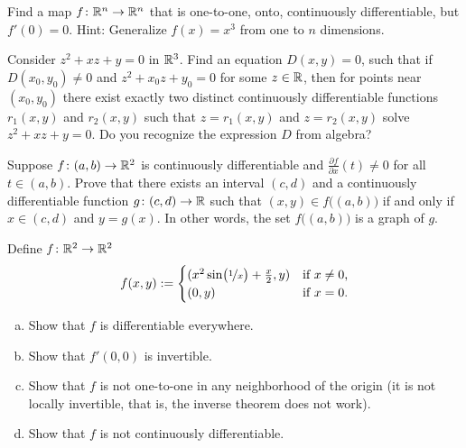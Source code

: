 \begin{exercise}
Find a map $f \colon {\mathbb{R}}^n \to {\mathbb{R}}^n$ that is one-to-one, onto,
continuously differentiable, but $f'(0) = 0$.  Hint: Generalize $f(x) = x^3$ from one
to $n$ dimensions.
\end{exercise}

\begin{exercise}
Consider $z^2 + xz + y =0$ in ${\mathbb{R}}^3$.  Find an equation $D(x,y)=0$, such that
if $D(x_0,y_0) \not= 0$ and $z^2+x_0z+y_0 = 0$ for some $z \in {\mathbb{R}}$,
then for points near $(x_0,y_0)$ there exist
exactly two distinct continuously differentiable functions $r_1(x,y)$
and $r_2(x,y)$ such that $z=r_1(x,y)$ and $z=r_2(x,y)$ solve
$z^2 + xz + y =0$.  Do you recognize the expression $D$ from algebra?
\end{exercise}


\begin{exercise}
Suppose $f \colon (a,b) \to {\mathbb{R}}^2$ is continuously differentiable and
$\frac{\partial f}{\partial x}(t) \not= 0$ for all $t \in (a,b)$.
Prove that there exists an interval $(c,d)$ and
a continuously differentiable function $g \colon (c,d) \to {\mathbb{R}}$
such that 
$(x,y) \in f\bigl((a,b)\bigr)$ if and only if $x \in (c,d)$ and $y=g(x)$.
In other words, the set
$f\bigl((a,b)\bigr)$ is a graph of $g$.
\end{exercise}

\begin{exercise}
Define $f \colon {\mathbb{R}}^2 \to {\mathbb{R}}^2$
\begin{equation*}
f(x,y) :=
\begin{cases}
(x^2 \sin \bigl(\nicefrac{1}{x}\bigr) + \frac{x}{2} , y ) & \text{if $x \not= 0$,} \\
(0,y) & \text{if $x=0$.}
\end{cases}
\end{equation*}
\begin{enumerate}[a)]
\item
Show that $f$ is differentiable everywhere.
\item
Show that $f'(0,0)$ is invertible.
\item
Show that $f$ is not one-to-one in any neighborhood of the origin (it is
not locally invertible, that is, the inverse theorem does not work).
\item
Show that $f$ is not continuously differentiable.
\end{enumerate}
\end{exercise}

